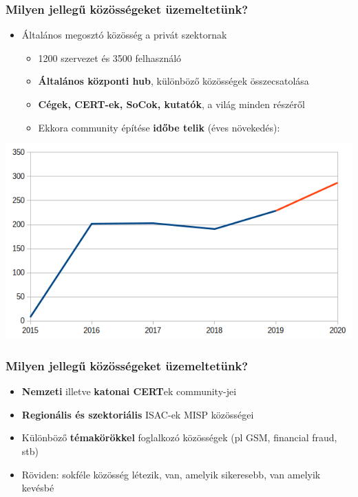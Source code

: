 \begin{frame}
  \frametitle{Milyen jellegű közösségeket üzemeltetünk?}
  \begin{itemize}
    \item Általános megosztó közösség a privát szektornak
    \begin{itemize}
      \item 1200 szervezet és 3500 felhasználó
      \item {\bf Általános központi hub}, különböző közösségek összecsatolása
      \item {\bf Cégek, CERT-ek, SoCok, kutatók}, a világ minden részéről
      \item Ekkora community építése {\bf időbe telik} (éves növekedés):
    \end{itemize}
  \end{itemize}
  \begin{center}
      \includegraphics[scale=0.5]{pics/org_growth.png}
  \end{center}

\end{frame}

\begin{frame}
  \frametitle{Milyen jellegű közösségeket üzemeltetünk?}
  \begin{itemize}
    \item {\bf Nemzeti} illetve {\bf katonai CERT}ek community-jei
    \item {\bf Regionális és szektoriális} ISAC-ek MISP közösségei
    \item Különböző {\bf témakörökkel} foglalkozó közösségek (pl GSM, financial fraud, stb)
    \item Röviden: sokféle közösség létezik, van, amelyik sikeresebb, van amelyik kevésbé
  \end{itemize}
\end{frame}

